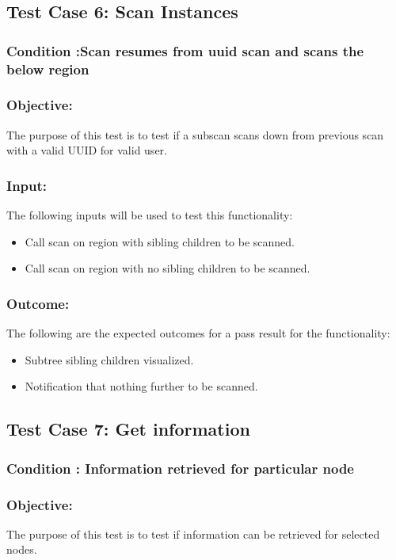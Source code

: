 \documentclass[hidelinks,a4paper,12pt]{article}
\begin{document}
\subsection{Test Case 6: Scan Instances }
\subsubsection{Condition :Scan resumes from uuid scan and scans the below region}
\subsubsection{Objective:} The purpose of this test is to test if a subscan scans down from previous scan with a valid UUID for valid user.

\subsubsection{Input:}
 The following inputs will be used to test this functionality:
\begin{itemize}
  \item Call scan on region with sibling children to be scanned.
   \item Call scan on region with no sibling children to be scanned.

\end{itemize}

\subsubsection{Outcome: }
The following are the expected outcomes for a pass result for the functionality:
\begin{itemize}
\item Subtree  sibling children visualized.
\item Notification that nothing further to be scanned.

\end{itemize}

\subsection{Test Case 7: Get information }
\subsubsection{Condition : Information retrieved for particular node}
\subsubsection{Objective:} The purpose of this test is to test if information can be retrieved for selected nodes.
\end{document}
